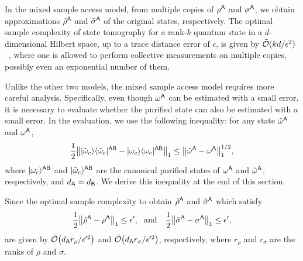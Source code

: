 In the mixed sample access model, from multiple copies of $\rho^{\mathsf{A}}$ and $\sigma^{\mathsf{A}}$, we obtain approximations $\tilde{\rho}^{\mathsf{A}}$ and $\tilde{\sigma}^{\mathsf{A}}$ of the original states, respectively.
The optimal sample complexity of state tomography for a rank-$k$ quantum state in a $d$-dimensional Hilbert space, up to a trace distance error of $\epsilon$, is given by $\tilde{{\mathcal{O}}}(kd/\epsilon^2)$~\cite{ODonnell2016EffTomo, Haah2017samploptTomo},
where one is allowed to perform collective measurements on multiple copies, possibly even an exponential number of them.




Unlike the other two models, the mixed sample access model requires more careful analysis.
Specifically, even though $\omega^{\mathsf{A}}$ can be estimated with a small error, it is necessary to evaluate whether the purified state can also be estimated with a small error.
In the evaluation, we use the following inequality: for any state $\tilde{\omega}^{\mathsf{A}}$ and $\omega^{\mathsf{A}}$,
\begin{align}
\label{inteq:26}
    \frac{1}{2}\big\||\tilde{\omega}_{\rm c}\rangle\langle\tilde{\omega}_{\rm c}|^{{\mathsf{A}}{\mathsf{B}}} - |\omega_{\rm c}\rangle\langle\omega_{\rm c}|^{{\mathsf{A}}{\mathsf{B}}}\big\|_1 
    \leq \big\|\tilde{\omega}^{\mathsf{A}} - \omega^{\mathsf{A}}\big\|_1^{1/2},
\end{align}
where $|\omega_{\rm c}\rangle^{{\mathsf{A}}{\mathsf{B}}}$ and $|\tilde{\omega}_{\rm c}\rangle^{{\mathsf{A}}{\mathsf{B}}}$ are the canonical purified states of $\omega^{\mathsf{A}}$ and $\tilde{\omega}^{\mathsf{A}}$, respectively, and $d_{\mathsf{A}} = d_{\mathsf{B}}$.
We derive this inequality at the end of this section.

Since the optimal sample complexity to obtain $\tilde{\rho}^{\mathsf{A}}$ and $\tilde{\sigma}^{\mathsf{A}}$ which satisfy
\begin{align}
    \frac{1}{2}\big\|\tilde{\rho}^{\mathsf{A}} - \rho^{\mathsf{A}} \big\|_1 \leq \epsilon',
    \ \  \text{and} \ \ \  
    \frac{1}{2}\big\|\tilde{\sigma}^{\mathsf{A}} - \sigma^{\mathsf{A}} \big\|_1 \leq \epsilon',
\end{align}
are given by $\tilde{{\mathcal{O}}}\big(d_{\mathsf{A}} r_\rho/\epsilon'^2\big)$ and $\tilde{{\mathcal{O}}}\big(d_{\mathsf{A}} r_\sigma /\epsilon'^2\big)$, respectively, where $r_\rho$ and $r_\sigma$ are the ranks of $\rho$ and $\sigma$.

